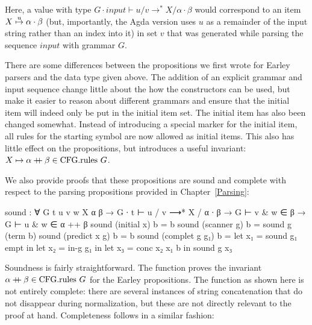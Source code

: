 		Here, a value with type $G \cdot \mathit{input} \vdash u / v \rightarrow^* X /
		\alpha \cdot \beta$ would correspond to an item
		$X\overset{u}{\mapsto}\alpha\cdot\beta$ (but, importantly, the Agda version uses
		$u$ as a remainder of the input string rather than an index into it) in
		set $v$ that was generated while parsing the sequence $\mathit{input}$ with grammar
		$G$.

		There are some differences between the propositions we first wrote for
		Earley parsers and the data type given above. The addition of an
		explicit grammar and input sequence change little about the how the
		constructors can be used, but make it easier to reason about different
		grammars and ensure that the initial item will indeed only be put in
		the initial item set. The initial item has also been changed somewhat.
		Instead of introducing a special marker for the initial item, all rules
		for the starting symbol are now allowed as initial items.  This also
		has little effect on the propositions, but introduces a useful
		invariant: $X \mapsto \alpha \mathbin{{+}\mspace{-8mu}{+}} \beta \in \textrm{CFG.rules } G$.

		We also provide proofs that these propositions are sound and complete
		with respect to the parsing propositions provided in Chapter~\ref{Parsing}:

		\begin{code}
			sound : ∀ {G t u v w X α β} →
			  G ∙ t ⊢ u / v ⟶* X / α ∙ β →
			    G ⊢ v & w ∈ β →
			    G ⊢ u & w ∈ α ++ β
			sound (initial x) b = b
			sound (scanner g) b = sound g (term b)
			sound (predict x g) b = b
			sound (complet g g₁) b =
			  let x₁ = sound g₁ empt in
			  let x₂ = in-g g₁ in
			  let x₃ = conc x₂ x₁ b in
			  sound g x₃
		\end{code}

		Soundness is fairly straightforward. The  function proves
		the invariant $\alpha \mathbin{{+}\mspace{-8mu}{+}} \beta \in \textrm{CFG.rules } G$ for the
		Earley propositions. The function as shown here is not entirely
		complete: there are several instances of string concatenation that do
		not disappear during normalization, but these are not directly relevant
		to the proof at hand. Completeness follows in a similar fashion:

